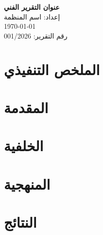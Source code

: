 \documentclass[11pt,a4paper]{article}
\newcommand{\reporttitle}{عنوان التقرير الفني}
\newcommand{\reportnumber}{رقم التقرير: 001/2026}
\begin{document}
\begin{center}
    {\LARGE\textbf{\reporttitle}}\\[1cm]
    {\large إعداد: اسم المنظمة}\\[0.5cm]
    {\large \today}\\[0.5cm]
    {\large \reportnumber}
\end{center}

\vspace{1cm}

\section*{الملخص التنفيذي}


\tableofcontents
\newpage


\section{المقدمة}


\section{الخلفية}


\section{المنهجية}



\section{النتائج}
\end{document}
